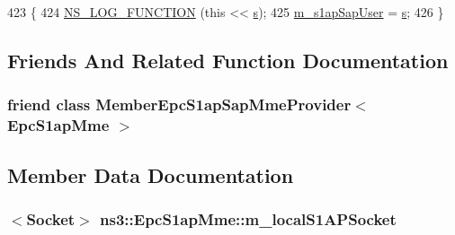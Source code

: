 \begin{DoxyCode}
423 \{
424   \hyperlink{log-macros-disabled_8h_a90b90d5bad1f39cb1b64923ea94c0761}{NS\_LOG\_FUNCTION} (\textcolor{keyword}{this} << \hyperlink{generate__test__data__lte__sinr_8m_ad83eeb3a142285d1243a08c6b7026df8}{s});
425   \hyperlink{classns3_1_1EpcS1apMme_ab9994a301789a31ce3c324f80266619b}{m\_s1apSapUser} = \hyperlink{generate__test__data__lte__sinr_8m_ad83eeb3a142285d1243a08c6b7026df8}{s};
426 \}
\end{DoxyCode}


\subsection{Friends And Related Function Documentation}
\subsubsection[{\texorpdfstring{Member\+Epc\+S1ap\+Sap\+Mme\+Provider$<$ Epc\+S1ap\+Mme $>$}{MemberEpcS1apSapMmeProvider< EpcS1apMme >}}]{\setlength{\rightskip}{0pt plus 5cm}friend class {\bf Member\+Epc\+S1ap\+Sap\+Mme\+Provider}$<$ {\bf Epc\+S1ap\+Mme} $>$\hspace{0.3cm}{\ttfamily [friend]}}\hypertarget{classns3_1_1EpcS1apMme_a596b2bed061bf70c49b9c82345f3d318}{}\label{classns3_1_1EpcS1apMme_a596b2bed061bf70c49b9c82345f3d318}


\subsection{Member Data Documentation}
\subsubsection[{\texorpdfstring{m\+\_\+local\+S1\+A\+P\+Socket}{m_localS1APSocket}}]{$<${\bf Socket}$>$ ns3\+::\+Epc\+S1ap\+Mme\+::m\+\_\+local\+S1\+A\+P\+Socket\hspace{0.3cm}{\ttfamily [private]}}\hypertarget{classns3_1_1EpcS1apMme_ac6fd7b6db143acc64d001a9fec7b0f3f}{}\label{classns3_1_1EpcS1apMme_ac6fd7b6db143acc64d001a9fec7b0f3f}
